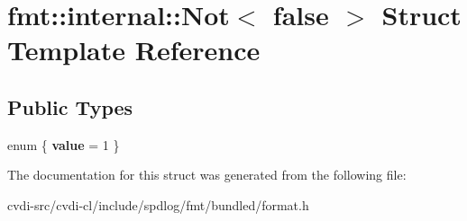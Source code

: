 \hypertarget{structfmt_1_1internal_1_1Not_3_01false_01_4}{}\section{fmt\+:\+:internal\+:\+:Not$<$ false $>$ Struct Template Reference}
\label{structfmt_1_1internal_1_1Not_3_01false_01_4}
\subsection*{Public Types}
\begin{DoxyCompactItemize}
\item 
enum \{ {\bfseries value} = 1
 \}\hypertarget{structfmt_1_1internal_1_1Not_3_01false_01_4_a2ec5a6c33abbed29c45dba33cca3c4f8}{}\label{structfmt_1_1internal_1_1Not_3_01false_01_4_a2ec5a6c33abbed29c45dba33cca3c4f8}

\end{DoxyCompactItemize}


The documentation for this struct was generated from the following file\+:\begin{DoxyCompactItemize}
\item 
cvdi-\/src/cvdi-\/cl/include/spdlog/fmt/bundled/format.\+h\end{DoxyCompactItemize}
